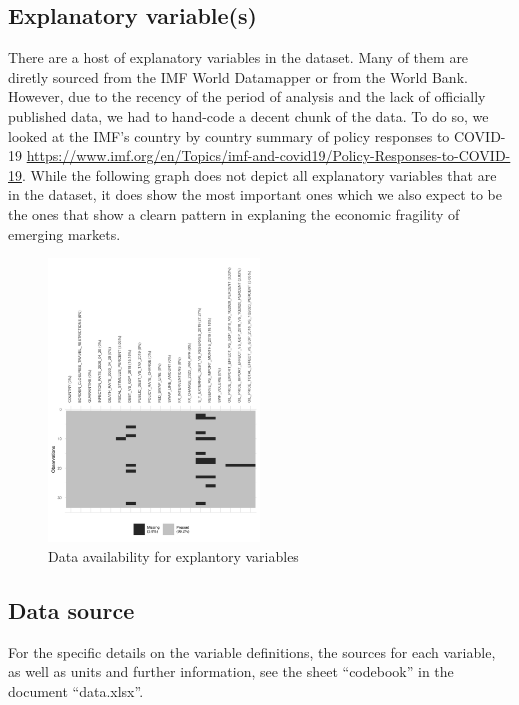 \documentclass[11pt,]{article}
\begin{document}
\hypertarget{explanatory-variables}{%
\subsection{Explanatory variable(s)}\label{explanatory-variables}}

There are a host of explanatory variables in the dataset. Many of them
are diretly sourced from the IMF World Datamapper or from the World
Bank. However, due to the recency of the period of analysis and the lack
of officially published data, we had to hand-code a decent chunk of the
data. To do so, we looked at the IMF's country by country summary of
policy responses to COVID-19
\url{https://www.imf.org/en/Topics/imf-and-covid19/Policy-Responses-to-COVID-19}.
While the following graph does not depict all explanatory variables that
are in the dataset, it does show the most important ones which we also
expect to be the ones that show a clearn pattern in explaning the
economic fragility of emerging markets.

\begin{figure}
\centering
\includegraphics[width=0.5\textwidth,height=\textheight]{reportfigures/missingdata_predictors.png}
\caption{Data availability for explantory variables}
\end{figure}

\hypertarget{data-source}{%
\subsection{Data source}\label{data-source}}

For the specific details on the variable definitions, the sources for
each variable, as well as units and further information, see the sheet
``codebook'' in the document ``data.xlsx''.
\end{document}
